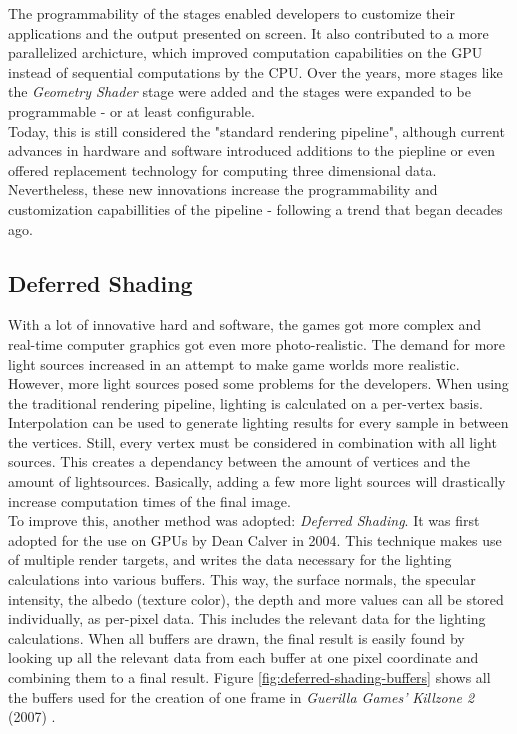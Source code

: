 \noindent
The programmability of the stages enabled developers to customize their applications and the output presented 
on screen. It also contributed to a more parallelized archicture, which improved computation capabilities on 
the \ac{GPU} instead of sequential computations by the \ac{CPU}. Over the years, more stages like the 
\emph{Geometry Shader} stage were added and the stages were expanded to be programmable - or at least configurable. \\

\noindent
Today, this is still considered the "standard rendering pipeline", although current advances in hardware and software 
introduced additions to the piepline or even offered replacement technology for computing three dimensional data.
Nevertheless, these new innovations increase the programmability and customization capabillities of the pipeline -  
following a trend that began decades ago.


\subsection*{Deferred Shading} \label{subsec-deferred-rendering}

With a lot of innovative hard and software, the games got more complex and real-time computer graphics got even more 
photo-realistic. The demand for more light sources increased in an attempt to make game worlds more realistic. 
However, more light sources posed some problems for the developers. When using the traditional rendering pipeline, 
lighting is calculated on a per-vertex basis. Interpolation can be used to generate lighting results for every sample 
in between the vertices. Still, every vertex must be considered in combination with all light sources. This creates a 
dependancy between the amount of vertices and the amount of lightsources. Basically, adding a few more light sources 
will drastically increase computation times of the final image. \\

\noindent
To improve this, another method was adopted: \emph{Deferred Shading}. It was first adopted for the use on \ac{GPU}s 
by Dean Calver \cite{Calver2004} in 2004. This technique makes use of multiple render targets, and writes the data 
necessary for the lighting calculations into various buffers. This way, the surface normals, the specular intensity, 
the albedo (texture color), the depth and more values can all be stored individually, as per-pixel data. This includes 
the relevant data for the lighting calculations. When all buffers are drawn, the final result is easily found by 
looking up all the relevant data from each buffer at one pixel coordinate and combining them to a final result. Figure 
\ref{fig:deferred-shading-buffers} shows all the buffers used for the creation of one frame in \emph{Guerilla Games'} 
\emph{Killzone 2} (2007) \cite{KillzoneFandom}. 

